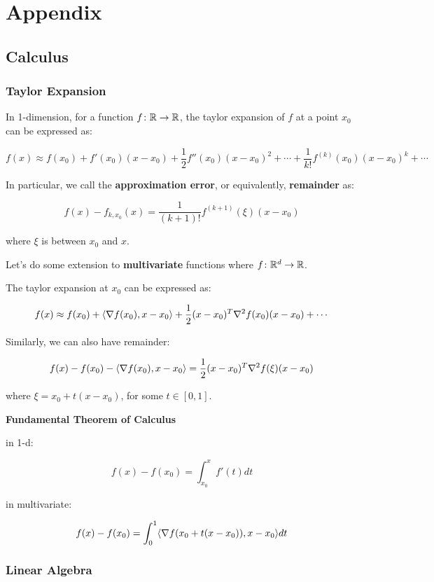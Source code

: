 
\part{Appendix}
\chapter{Calculus}

\section{Taylor Expansion} 

In 1-dimension, for a function \(f \colon \mathbb{R} \to \mathbb{R}\), the taylor expansion of \(f\) at a point 
\(x_0\) can be expressed as: 

\[
    f(x) \approx f(x_0) + f'(x_0) (x - x_0) + \frac{1}{2} f'' (x_0) (x - x_0)^2 + \cdots 
    + \frac{1}{k!} f^{(k)}(x_0) (x - x_0)^k + \cdots 
\]

In particular, we call the \textbf{approximation error}, or equivalently, \textbf{remainder}
as: 

\[
    f(x) - f_{k, x_0} (x) = \frac{1}{(k+1)!} f^{(k+1)} (\xi) (x - x_0)
\]

where \(\xi\) is between \(x_0\) and \(x\). 


Let's do some extension to \textbf{multivariate} functions where \(f \colon \mathbb{R}^d \to \mathbb{R}\). 

The taylor expansion at \(x_0\) can be expressed as: 

\[
    f(x) \approx f(x_0) + \langle \nabla f(x_0),  x - x_0 \rangle + 
    \frac{1}{2}(x - x_0)^T \nabla^2 f(x_0) (x - x_0) + \cdots 
\] 

Similarly, we can also have remainder: 

\[
    f(x) - f(x_0) - \langle \nabla f(x_0),  x - x_0 \rangle 
    =  \frac{1}{2} (x - x_0)^T \nabla^2 f(\xi) (x - x_0)
\]

where \(\xi = x_0 + t (x - x_0)\), for some \(t \in [0,1]\). 

\textbf{Fundamental Theorem of Calculus}

in 1-d: 

\[
    f(x) - f(x_0) = \int_{x_0}^{x} f'(t) dt
\]

in multivariate: 

\[
    f(x) - f(x_0) = \int_0^1 \langle \nabla f(x_0 + t(x - x_0)), x - x_0 \rangle dt 
\]

\section{Linear Algebra}

